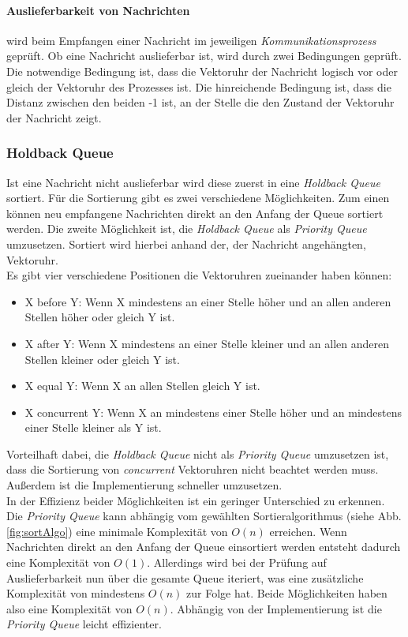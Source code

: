 \paragraph{Auslieferbarkeit von Nachrichten} wird beim Empfangen einer Nachricht im jeweiligen \textit{Kommunikationsprozess} geprüft. Ob eine Nachricht auslieferbar ist, wird durch zwei Bedingungen geprüft. Die notwendige Bedingung ist, dass die Vektoruhr der Nachricht logisch vor oder gleich der Vektoruhr des Prozesses ist. Die hinreichende Bedingung ist, dass die Distanz zwischen den beiden -1 ist, an der Stelle die den Zustand der Vektoruhr der Nachricht zeigt.

\subsubsection{Holdback Queue} \label{hbq_theory}

Ist eine Nachricht nicht auslieferbar wird diese zuerst in eine \textit{Holdback Queue} sortiert. Für die Sortierung gibt es zwei verschiedene Möglichkeiten. Zum einen können neu empfangene Nachrichten direkt an den Anfang der Queue sortiert werden. Die zweite Möglichkeit ist, die \textit{Holdback Queue} als \textit{Priority Queue} umzusetzen. Sortiert wird hierbei anhand der, der Nachricht angehängten, Vektoruhr.\\
Es gibt vier verschiedene Positionen die Vektoruhren zueinander haben können:
\begin{itemize} \label{positionVTs}
  \item X before Y: Wenn X mindestens an einer Stelle höher und an allen anderen Stellen höher oder gleich Y ist.
  \item X after Y: Wenn X mindestens an einer Stelle kleiner und an allen anderen Stellen kleiner oder gleich Y ist.
  \item X equal Y: Wenn X an allen Stellen gleich Y ist.
  \item X concurrent Y: Wenn X an mindestens einer Stelle höher und an mindestens einer Stelle kleiner als Y ist.
\end{itemize}

Vorteilhaft dabei, die \textit{Holdback Queue} nicht als \textit{Priority Queue} umzusetzen ist, dass die Sortierung von \textit{concurrent} Vektoruhren nicht beachtet werden muss. Außerdem ist die Implementierung schneller umzusetzen.\\
In der Effizienz beider Möglichkeiten ist ein geringer Unterschied zu erkennen. Die \textit{Priority Queue} kann abhängig vom gewählten Sortieralgorithmus (siehe Abb. \ref{fig:sortAlgo}) eine minimale Komplexität von $O(n)$ erreichen. Wenn Nachrichten direkt an den Anfang der Queue einsortiert werden entsteht dadurch eine Komplexität von $O(1)$. Allerdings wird bei der Prüfung auf Auslieferbarkeit nun über die gesamte Queue iteriert, was eine zusätzliche Komplexität von mindestens $O(n)$ zur Folge hat. Beide Möglichkeiten haben also eine Komplexität von $O(n)$. Abhängig von der Implementierung ist die \textit{Priority Queue} leicht effizienter. 

